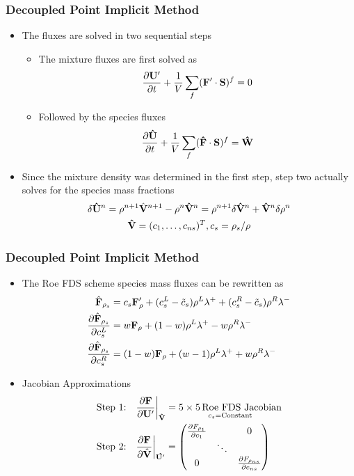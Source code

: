 \documentclass{beamer}
\begin{document}
\begin{frame}
  \frametitle{Decoupled Point Implicit Method}
  \begin{itemize}
    \item The fluxes are solved in two sequential steps
      \begin{itemize}
        \item  The mixture fluxes are first solved as
        \[
          \frac{\partial \mathbf U'}{\partial t} +
          \frac{1}{V}\sum\limits_{f}(\mathbf F'\cdot\mathbf S)^f = 0
        \]
      \item Followed by the species fluxes
      \[
        \frac{\partial \mathbf{\hat{U}}}{\partial t} +
        \frac{1}{V}\sum\limits_{f}(\mathbf{\hat{F}}\cdot \mathbf S)^f =
        \mathbf{\hat{W}}
      \]
    \end{itemize}
    \item Since the mixture density was determined in the first step, step two
      actually solves for the species mass fractions
      \begin{gather*}
        \delta \mathbf{\hat{U}}^n 
        = \rho^{n+1} \hat{\mathbf V}^{n+1}-\rho^n\mathbf{\hat{V}}^n = \rho^{n+1} \delta
        \mathbf{\hat{V}}^n + \mathbf{\hat{V}}^n \delta \rho^n \\
        \mathbf{\hat{V}}=(c_1,\hdots,c_{ns})^T, c_s=\rho_s/\rho
      \end{gather*}
  \end{itemize}
\end{frame}
\begin{frame}
  \frametitle{Decoupled Point Implicit Method}
  \begin{itemize}
    \item The Roe FDS scheme species mass fluxes can be rewritten as
      \begin{align*}
  	\hat{\mathbf F}_{\rho_s} &= c_s \mathbf F'_\rho+(c_s^L-\tilde{c}_s)\rho^L\lambda^+
  	+ (c_s^R-\tilde{c}_s)\rho^R\lambda^- \\
	\frac{\partial \hat{\mathbf F}_{\rho_s}}{\partial c_s^L} 
	&= w\mathbf F_\rho+(1-w)\rho^L\lambda^+ - w\rho^R\lambda^- \\
	\frac{\partial \hat{\mathbf F}_{\rho_s}}{\partial c_s^R} 
	&= (1-w)\mathbf F_\rho+(w-1)\rho^L\lambda^+ + w\rho^R\lambda^- \label{d_last}
      \end{align*}
    \item Jacobian Approximations
      \begin{align*}
	\text{Step 1:}\quad &
	\frac{\partial \mathbf F}{\partial \mathbf U'}\bigg|_{\mathbf{\hat{V}}} =
	\underset{c_s = \text{Constant}}{5 \times 5\,\text{Roe FDS Jacobian}} \\
	\text{Step 2:}\quad & 
	\frac{\partial \mathbf F}{\partial \hat{\mathbf V}}\bigg|_{\mathbf{\hat{U'}}} = 
        \begin{pmatrix} 
          \frac{\partial F_{\rho_1}}{\partial c_1} & & 0
          \\ & \ddots &  \\ 0 & & \frac{\partial F_{\rho_{ns}}}{\partial c_{ns}}
        \end{pmatrix} 
      \end{align*}
  \end{itemize}
\end{frame}
\end{document}
